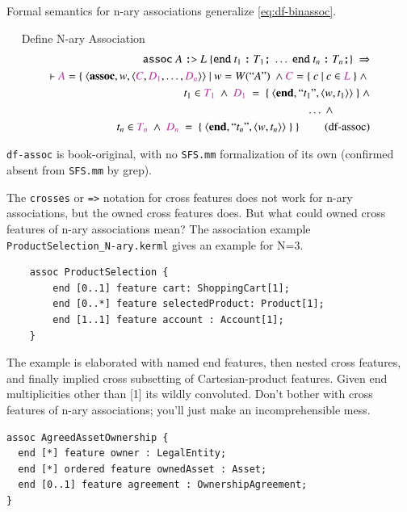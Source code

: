 \pn Formal semantics for n-ary associations generalize \ref{eq:df-binassoc}.

\begin{definition}~~   Define N-ary Association
\begin{align}
\texttt{assoc}~ A~\texttt{:>}~L~\{ \texttt{end}~ t_1 ~\texttt{:}~ T_1\texttt{;}~\ldots~ \texttt{end}~ t_n ~\texttt{:}~ T_n\texttt{;} \}~\Rightarrow  \notag \\
\vdash \mc{A} = \{~\langle \textbf{assoc},w,\langle \mc{C},\mc{D_1},\ldots,\mc{D_n}\rangle\rangle ~\vert~
w=W(``A")~ \wedge 
\mc{C}=\{~c~\vert ~c \in \mc{L}~\}~\wedge~\notag \\
~t_1\in \mc{T_1}~\wedge~\mc{D_1}~=~\{~\langle\textbf{end},``t_1",\langle w,t_1 \rangle\rangle~\}~\wedge \notag \\
~~~\ldots~\wedge~~~~~~~~~~~~~ \notag \\
~t_n\in \mc{T_n}~\wedge~\mc{D_n}~=~\{~\langle\textbf{end},``t_n",\langle w,t_n \rangle\rangle~\}~\}~\label{eq:df-assoc}\tag{df-assoc}
\end{align}
\end{definition}

\pn \texttt{df-assoc} is book-original, with no \texttt{SFS.mm} formalization of its own (confirmed absent
from \texttt{SFS.mm} by grep).

\pn The \texttt{crosses} or \texttt{=>} notation for cross features does not work for n-ary associations, but the owned cross features does.
But what could owned cross features of n-ary associations mean?  The association example \texttt{ProductSelection\_N-ary.kerml} gives an example for N=3.

\begin{lstlisting}
	assoc ProductSelection {
		end [0..1] feature cart: ShoppingCart[1];
		end [0..*] feature selectedProduct: Product[1];
		end [1..1] feature account : Account[1];
	}
\end{lstlisting}

\pn The example is elaborated with named end features, then nested cross features, and finally implied cross subsetting of Cartesian-product features.  Given end multiplicities other than [1] its wildly convoluted.  Don't bother with cross features of n-ary associations; you'll just make an incomprehensible mess.

\begin{lstlisting}
assoc AgreedAssetOwnership {
  end [*] feature owner : LegalEntity;
  end [*] ordered feature ownedAsset : Asset;
  end [0..1] feature agreement : OwnershipAgreement;
}
\end{lstlisting}

